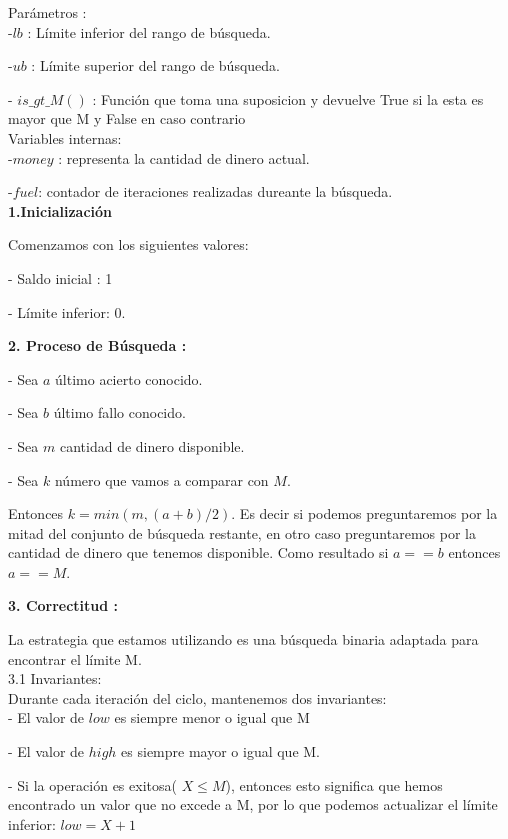 \documentclass[
10pt, %
a4paper, %
oneside, %
headinclude,footinclude, %
BCOR5mm, %
]{scrartcl}
\begin{document}
Parámetros :\\

-$lb$ : Límite inferior del rango de búsqueda.


-$ub$ : Límite superior del rango de búsqueda.


- $is\_gt\_M()$ : Función que toma una suposicion y devuelve True si la esta es mayor que M y False en caso contrario\\

Variables internas: \\

-$money$ : representa la cantidad de dinero actual.

-$fuel$: contador de iteraciones realizadas dureante la búsqueda. \\

\textbf{1.Inicialización}
 
Comenzamos con los siguientes valores:

- Saldo inicial : 1


- Límite inferior: 0.

\textbf{2. Proceso de Búsqueda :} 

- Sea $a$ último acierto conocido.

- Sea $b$ último fallo conocido.

- Sea $m$ cantidad de dinero disponible.

- Sea $k$ número que vamos a comparar 
con $M$.


Entonces $k = min(m, (a+b)/2)$. Es 
decir si podemos preguntaremos por la 
mitad del conjunto de búsqueda 
restante, en otro caso preguntaremos 
por la cantidad de dinero que tenemos 
disponible. Como resultado si $a == b$ 
entonces $a == M$.


\textbf{3. Correctitud :} 

La estrategia que estamos utilizando es una búsqueda binaria adaptada para encontrar el límite M.\\


3.1 Invariantes:\\

Durante cada iteración del ciclo, mantenemos dos invariantes:\\


- El valor de $low$ es siempre menor o igual que M


- El valor de $high$ es siempre mayor o igual que M.


- Si la operación es exitosa( $X \leq M$), entonces esto significa que hemos encontrado un valor que no excede a M, por lo que podemos actualizar el límite inferior: $low = X+1$
\end{document}
